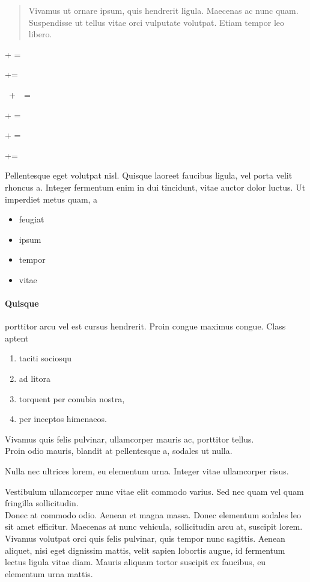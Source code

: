 \documentclass{scrartcl}
\begin{document}
\begin{quote}
Vivamus ut ornare ipsum, quis hendrerit ligula. Maecenas ac nunc quam. Suspendisse ut tellus vitae orci vulputate volutpat. Etiam tempor leo libero.
\end{quote}

\textonehalf + \textonequarter = \textthreequarters


\textonehalf+\textonequarter=\textthreequarters


\textonehalf~+~\textonequarter~=~\textthreequarters


\textonehalf  +         \textonequarter  =     \textthreequarters


{\textonehalf} + {\textonequarter} = {\textthreequarters}

{\textonehalf}+{\textonequarter}={\textthreequarters}


Pellentesque eget volutpat nisl. Quisque laoreet faucibus ligula, vel porta velit rhoncus a. Integer fermentum enim in dui tincidunt, vitae auctor dolor luctus. Ut imperdiet metus quam, a 

\begin{itemize}
 \item feugiat
 \item ipsum
 \item tempor 
 \item vitae
\end{itemize}

\paragraph{Quisque}
porttitor arcu vel est cursus hendrerit. Proin congue maximus congue. Class aptent 
\begin{enumerate}
 \item taciti sociosqu
 \item  ad litora
 \item torquent per conubia nostra, 
 \item  per inceptos himenaeos. 
\end{enumerate}


Vivamus quis felis pulvinar, ullamcorper mauris ac, porttitor tellus.\\
Proin odio mauris, blandit at pellentesque a, sodales ut nulla.

Nulla nec ultrices lorem, eu elementum urna. Integer vitae ullamcorper risus. 

\noindent
Vestibulum ullamcorper nunc vitae elit commodo varius. Sed nec quam vel quam fringilla sollicitudin.\\
Donec at commodo odio. Aenean et magna massa. Donec elementum sodales leo sit amet efficitur. Maecenas at nunc vehicula, sollicitudin arcu at, suscipit lorem. Vivamus volutpat orci quis felis pulvinar, quis tempor nunc sagittis. Aenean aliquet, nisi eget dignissim mattis, velit sapien lobortis augue, id fermentum lectus ligula vitae diam. Mauris aliquam tortor suscipit ex faucibus, eu elementum urna mattis. 
\end{document}
